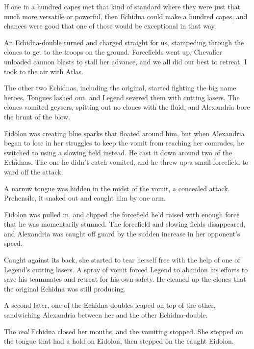 If one in a hundred capes met that kind of standard where they were just that much more versatile or powerful, then Echidna could make a hundred capes, and chances were good that one of those would be exceptional in that way.



An Echidna-double turned and charged straight for us, stampeding through the clones to get to the troops on the ground.  Forcefields went up, Chevalier unloaded cannon blasts to stall her advance, and we all did our best to retreat.  I took to the air with Atlas.



The other two Echidnas, including the original, started fighting the big name heroes.  Tongues lashed out, and Legend severed them with cutting lasers.  The clones vomited geysers, spitting out no clones with the fluid, and Alexandria bore the brunt of the blow.



Eidolon was creating blue sparks that floated around him, but when Alexandria began to lose in her struggles to keep the vomit from reaching her comrades, he switched to using a slowing field instead.  He cast it down around two of the Echidnas.  The one he didn't catch vomited, and he threw up a small forcefield to ward off the attack.



A narrow tongue was hidden in the midst of the vomit, a concealed attack.  Prehensile, it snaked out and caught him by one arm.



Eidolon was pulled in, and clipped the forcefield he'd raised with enough force that he was momentarily stunned.  The forcefield and slowing fields disappeared, and Alexandria was caught off guard by the sudden increase in her opponent's speed.  



Caught against its back, she started to tear herself free with the help of one of Legend's cutting lasers.  A spray of vomit forced Legend to abandon his efforts to save his teammates and retreat for his own safety.  He cleaned up the clones that the original Echidna was still producing.



A second later, one of the Echidna-doubles leaped on top of the other, sandwiching Alexandria between her and the other Echidna-double.



The \emph{real} Echidna closed her mouths, and the vomiting stopped.  She stepped on the tongue that had a hold on Eidolon, then stepped on the caught Eidolon.




